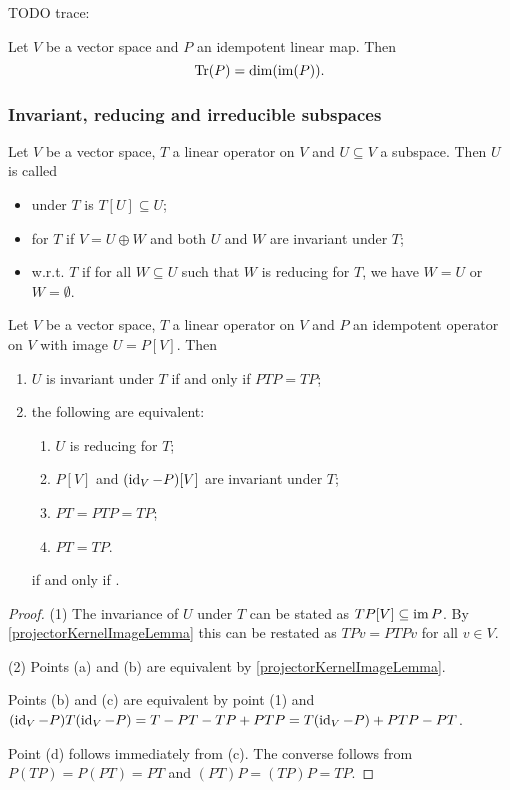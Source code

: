 TODO trace:
\begin{lemma}
Let $V$ be a vector space and $P$ an idempotent linear map. Then
\[ \operatorname{Tr}(P) = \dim(\operatorname{im}(P)). \]
\end{lemma}


\subsubsection{Invariant, reducing and irreducible subspaces}
\begin{definition}
Let $V$ be a vector space, $T$ a linear operator on $V$ and $U\subseteq V$ a subspace. Then $U$ is called
\begin{itemize}
    \item {} under $T$ is $T[U]\subseteq U$;
    \item {} for $T$ if $V = U\oplus W$ and both $U$ and $W$ are invariant under $T$;
    \item {} w.r.t. $T$ if for all $W\subseteq U$ such that $W$ is reducing for $T$, we have $W = U$ or $W = \emptyset$.
\end{itemize}
\end{definition}

\begin{lemma}
Let $V$ be a vector space, $T$ a linear operator on $V$ and $P$ an idempotent operator on $V$ with image $U = P[V]$. Then 
\begin{enumerate}
\item $U$ is invariant under $T$ \textup{if and only if} $PTP = TP$;
\item the following are equivalent:
\begin{enumerate}
\item $U$ is reducing for $T$;
\item $P[V]$ and $(\operatorname{id}_V - P)[V]$ are invariant under $T$;
\item $PT = PTP = TP$;
\item $PT = TP$.
\end{enumerate} \textup{if and only if} .
\end{enumerate}
\end{lemma}
\begin{proof}
(1) The invariance of $U$ under $T$ can be stated as $TP[V] \subseteq \operatorname{im} P$. By \ref{projectorKernelImageLemma} this can be restated as $TPv = PTPv$ for all $v\in V$.

(2) Points (a) and (b) are equivalent by \ref{projectorKernelImageLemma}.

Points (b) and (c) are equivalent by point (1) and $(\operatorname{id}_V - P)T(\operatorname{id}_V - P) = T - PT - TP + PTP = T(\operatorname{id}_V - P) + PTP - PT$.

Point (d) follows immediately from (c). The converse follows from $P(TP) = P(PT) = PT$ and $(PT)P = (TP)P = TP$.
\end{proof}

